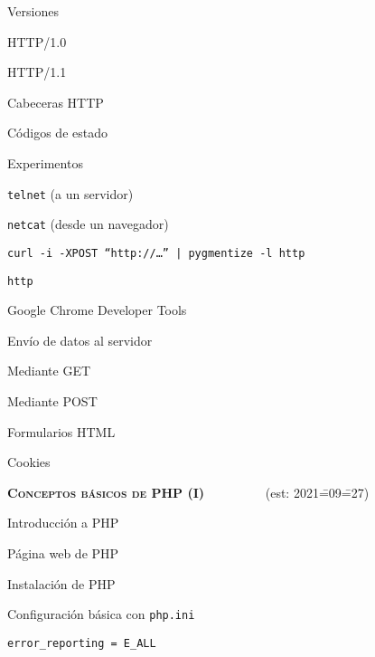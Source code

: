 \begin{longenum}
\begin{longenum}
\begin{longenum}
            \item Versiones
            \begin{longenum}
                \item HTTP/1.0
                \item HTTP/1.1
            \end{longenum}
            \item Cabeceras HTTP
            \item Códigos de estado
            \item Experimentos
            \begin{longenum}
                \item \texttt{telnet} (a un servidor)
                \item \texttt{netcat} (desde un navegador)
                \item \texttt{curl -i -XPOST “http://…” | pygmentize -l http}
                \item \texttt{http}
                \item Google Chrome Developer Tools
            \end{longenum}
            \item Envío de datos al servidor
            \begin{longenum}
                \item Mediante GET
                \item Mediante POST
                \item Formularios HTML
            \end{longenum}
            \item Cookies
        \end{longenum}
    \end{longenum}
    \item \textbf{\textsc{Conceptos básicos de PHP (I)}} \ \ \ \ \ \ \ \ \ (est: 2021\==09\==27)
    \begin{longenum}
        \item Introducción a PHP
        \begin{longenum}
            \item Página web de PHP
            \item Instalación de PHP
            \item Configuración básica con \texttt{php.ini}
            \begin{longenum}
                \item \texttt{error\_reporting = E\_ALL}

\end{longenum}
\end{longenum}
\end{longenum}
\end{longenum}
